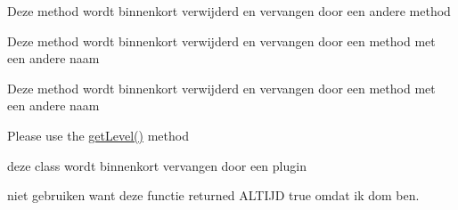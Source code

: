 
\begin{DoxyRefList}
\item[Global \mbox{\hyperlink{classmohagames_1_1_plot_area_1_1utils_1_1_group_a51b2eb935c8a092010deb241ae364e32}{Group::get\+Group}} (\$group\+\_\+name)]\label{deprecated__deprecated000001}%
%
Deze method wordt binnenkort verwijderd en vervangen door een andere method  
\item[Global \mbox{\hyperlink{classmohagames_1_1_plot_area_1_1utils_1_1_group_a80ff7d4e6101b55bc46ce120b838b98d}{Group::get\+Group\+Id}} ()]\label{deprecated__deprecated000003}%
%
Deze method wordt binnenkort verwijderd en vervangen door een method met een andere naam  
\item[Global \mbox{\hyperlink{classmohagames_1_1_plot_area_1_1utils_1_1_group_abdfd06a2b3f8c7012f0f7b028444e4cc}{Group::save\+Group}} (\$group\+\_\+name, \mbox{\hyperlink{classmohagames_1_1_plot_area_1_1utils_1_1_plot}{Plot}} \$master\+\_\+plot, \mbox{\hyperlink{classmohagames_1_1_plot_area_1_1utils_1_1_plot}{Plot}} \$second\+\_\+plot)]\label{deprecated__deprecated000002}%
%
Deze method wordt binnenkort verwijderd en vervangen door een method met een andere naam  
\item[Global \mbox{\hyperlink{classmohagames_1_1_plot_area_1_1utils_1_1_plot_a5c1649570574f16801c868c91ccfc080}{Plot::get\+Level\+Name}} ()]\label{deprecated__deprecated000004}%
%
Please use the \mbox{\hyperlink{classmohagames_1_1_plot_area_1_1utils_1_1_plot_a23fac327059bf3fd0fe57555252d8cf2}{get\+Level()}} method  
\item[Global \mbox{\hyperlink{classmohagames_1_1_plot_area_1_1utils_1_1_public_chest_a1976ea3d57dde82926fd49167ee5e2cb}{Public\+Chest::\+\_\+\+\_\+construct}} (array \$chest\+\_\+location, string \$chest\+\_\+world, int \$plot\+\_\+id)]\label{deprecated__deprecated000005}%
%
deze class wordt binnenkort vervangen door een plugin 
\item[Global \mbox{\hyperlink{classmohagames_1_1_plot_area_1_1utils_1_1_public_chest_ac0eb21abcd8889b02b75c545a480fb48}{Public\+Chest::is\+Public}} ()]\label{deprecated__deprecated000006}%
%
niet gebruiken want deze functie returned A\+L\+T\+I\+JD true omdat ik dom ben. 
\end{DoxyRefList}
